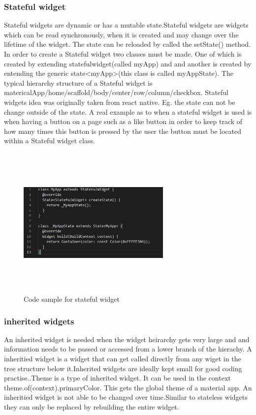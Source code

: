 \subsubsection{Stateful widget}
Stateful widgets are dynamic or has a mutable state.Stateful widgets are widgets which can be read synchronously, when it is created and may change over the lifetime of the widget. The state can be reloaded by called the setState() method. In order to create a Stateful widget two classes must be made. One of which is created by extending statefulwidget(called myApp) and and another is created by entending the generic state<myApp>(this class is called myAppState). The typical hierarchy structure of a Stateful widget is matericalApp/home/scaffold/body/center/row/column/checkbox.\cite{widgets} \cite{stateful} Stateful widgets idea was originally taken from react native. Eg. the state can not  be change outside of the state. A real example as to when a stateful widget is used is when having a button on a page such as a like button in order to keep track of how many times this button is pressed by the user the button must be located within a Stateful widget class. \cite{choudhary_2019}


\begin{figure}[ht!]
    \centering
 \includegraphics[width=75mm, height=75mm,scale=0.5]{img/stateful.PNG}
\caption{Code sample for stateful widget}
\label{fig:stateful}
\end{figure}

\subsubsection{inherited widgets}
An inherited widget is needed when the widget heirarchy gets very large and and information needs to be passed or accessed from a lower branch of the hierachy. A inheritied widget is a widget that can get called directly from any wiget in the tree structure below it.Inherited widgets are ideally kept small for good coding practise.\cite{fidanboylu_2019}.Theme is a type of inherited widget. It can be used in the context theme.of(context).primaryColor. This gets the global theme of a material app. An inheritied widget is not able to be changed over time.Similar to stateless widgets they can only be replaced by rebuilding the entire widget.\cite{inherited_widgets}

